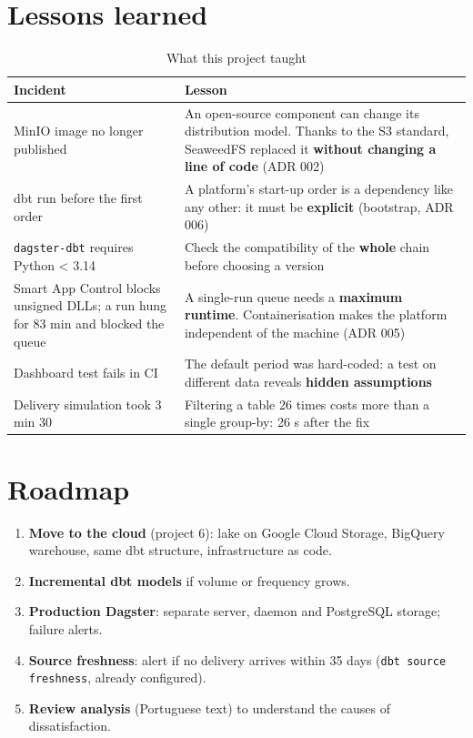 \documentclass[11pt, a4paper, oneside, headings=normal, numbers=noenddot, DIV=12]{scrartcl}
\begin{document}
\section{Lessons learned}
\begin{table}[H]
\centering\small
\begin{tabularx}{\linewidth}{@{}L{3.9cm} Y@{}}
\toprule
\textbf{Incident} & \textbf{Lesson} \\
\midrule
MinIO image no longer published & An open-source component can change its distribution model. Thanks to the S3 standard, SeaweedFS replaced it \textbf{without changing a line of code} (ADR 002) \\
dbt run before the first order & A platform's start-up order is a dependency like any other: it must be \textbf{explicit} (bootstrap, ADR 006) \\
\texttt{dagster-dbt} requires Python < 3.14 & Check the compatibility of the \textbf{whole} chain before choosing a version \\
Smart App Control blocks unsigned DLLs; a run hung for 83 min and blocked the queue & A single-run queue needs a \textbf{maximum runtime}. Containerisation makes the platform independent of the machine (ADR 005) \\
Dashboard test fails in CI & The default period was hard-coded: a test on different data reveals \textbf{hidden assumptions} \\
Delivery simulation took 3 min 30 & Filtering a table 26 times costs more than a single group-by: 26 s after the fix \\
\bottomrule
\end{tabularx}
\caption{What this project taught}
\end{table}

\section{Roadmap}
\begin{enumerate}[leftmargin=1.4em]
  \item \textbf{Move to the cloud} (project 6): lake on Google Cloud Storage, BigQuery warehouse, same dbt structure, infrastructure as code.
  \item \textbf{Incremental dbt models} if volume or frequency grows.
  \item \textbf{Production Dagster}: separate server, daemon and PostgreSQL storage; failure alerts.
  \item \textbf{Source freshness}: alert if no delivery arrives within 35 days (\texttt{dbt source freshness}, already configured).
  \item \textbf{Review analysis} (Portuguese text) to understand the causes of dissatisfaction.
\end{enumerate}
\end{document}
